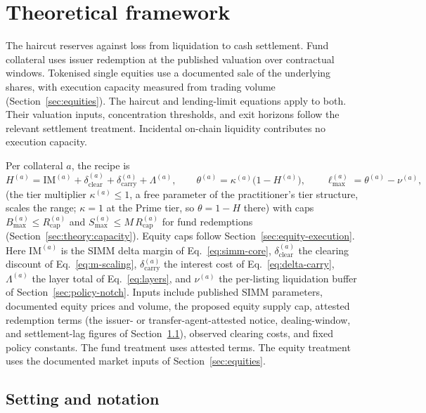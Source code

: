 \section{Theoretical framework}\label{sec:theory}

The haircut reserves against loss from liquidation to cash settlement. Fund collateral uses issuer redemption at the published valuation over contractual windows. Tokenised single equities use a documented sale of the underlying shares, with execution capacity measured from trading volume (Section~\ref{sec:equities}). The haircut and lending-limit equations apply to both. Their valuation inputs, concentration thresholds, and exit horizons follow the relevant settlement treatment. Incidental on-chain liquidity contributes no execution capacity.

Per collateral $a$, the recipe is
\begin{equation}\label{eq:recipe}
H^{(a)} = \mathrm{IM}^{(a)} + \delta_{\mathrm{clear}}^{(a)} + \delta_{\mathrm{carry}}^{(a)} + \Lambda^{(a)},\qquad
\theta^{(a)} = \kappa^{(a)}\bigl(1 - H^{(a)}\bigr),\qquad
\ell_{\max}^{(a)} = \theta^{(a)} - \nu^{(a)},
\end{equation}
(the tier multiplier $\kappa^{(a)}\le 1$, a free parameter of the practitioner's tier structure, scales the range; $\kappa=1$ at the Prime tier, so $\theta=1-H$ there)
with caps $B_{\max}^{(a)}\le R_{\mathrm{cap}}^{(a)}$ and $S_{\max}^{(a)}\le M\,R_{\mathrm{cap}}^{(a)}$ for fund redemptions (Section~\ref{sec:theory:capacity}). Equity caps follow Section~\ref{sec:equity-execution}. Here $\mathrm{IM}^{(a)}$ is the SIMM delta margin of Eq.~\eqref{eq:simm-core}, $\delta_{\mathrm{clear}}^{(a)}$ the clearing discount of Eq.~\eqref{eq:m-scaling}, $\delta_{\mathrm{carry}}^{(a)}$ the interest cost of Eq.~\eqref{eq:delta-carry}, $\Lambda^{(a)}$ the layer total of Eq.~\eqref{eq:layers}, and $\nu^{(a)}$ the per-listing liquidation buffer of Section~\ref{sec:policy-notch}. Inputs include published SIMM parameters, documented equity prices and volume, the proposed equity supply cap, attested redemption terms (the issuer- or transfer-agent-attested notice, dealing-window, and settlement-lag figures of Section~\ref{sec:theory:setting}), observed clearing costs, and fixed policy constants. The fund treatment uses attested terms. The equity treatment uses the documented market inputs of Section~\ref{sec:equities}.

\subsection{Setting and notation}\label{sec:theory:setting}

